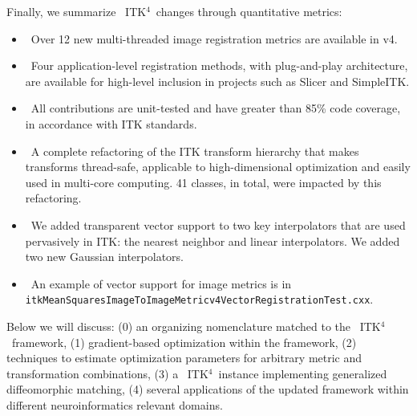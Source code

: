 \documentclass{frontiersSCNS}
\newcommand{\tk}{~ITK$^{\text{4}}$~}
\begin{document}
Finally, we summarize \tk changes through quantitative metrics:
\begin{itemize}
\item~Over 12 new multi-threaded image registration metrics are available in v4.
\item~Four application-level registration methods, with plug-and-play architecture, are available
  for high-level inclusion in projects such as Slicer and SimpleITK.
\item~All contributions are unit-tested and have greater than 85\% code coverage, in accordance with ITK standards.
\item~A complete refactoring of the ITK transform hierarchy that makes transforms thread-safe, applicable to high-dimensional optimization and easily used in multi-core computing. 41 classes, in total, were impacted by this refactoring.
\item~We added transparent vector support to two key interpolators that are used
  pervasively in ITK: the nearest neighbor and linear interpolators.
  We added two new Gaussian interpolators.
\item~An example of vector support for image metrics is in \newline \texttt{itkMeanSquaresImageToImageMetricv4VectorRegistrationTest.cxx}.
\end{itemize}
Below we will discuss: (0) an organizing nomenclature matched to the
\tk framework, (1) gradient-based optimization within the
framework, (2) techniques to estimate optimization parameters for
arbitrary metric and transformation combinations, (3) a \tk instance implementing generalized diffeomorphic
matching, (4) several
applications of the updated framework within different
neuroinformatics relevant domains.
\end{document}
